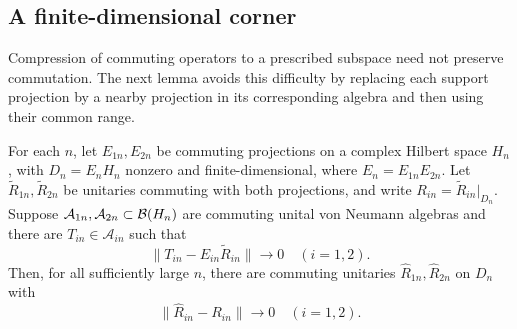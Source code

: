 \subsection{A finite-dimensional corner}
Compression of commuting operators to a prescribed subspace need not
preserve commutation. The next lemma avoids this difficulty by
replacing each support projection by a nearby projection in its
corresponding algebra and then using their common range.

\begin{lemma}\label{lem:corner}
For each $n$, let $E_{1n},E_{2n}$ be commuting projections on a complex
Hilbert space $H_n$, with $D_n=E_nH_n$ nonzero and finite-dimensional,
where $E_n=E_{1n}E_{2n}$. Let $\widetilde R_{1n},\widetilde R_{2n}$
be unitaries commuting with both projections, and write
$R_{in}=\widetilde R_{in}|_{D_n}$.
Suppose $\mathcal A_{1n},\mathcal A_{2n}\subset\mathcal B(H_n)$ are
commuting unital von Neumann algebras and there are
$T_{in}\in\mathcal A_{in}$ such that
\begin{equation}\label{eq:corner-hypothesis}
 \|T_{in}-E_{in}\widetilde R_{in}\|\longrightarrow0
 \quad(i=1,2).
\end{equation}
Then, for all sufficiently large $n$, there are commuting unitaries
$\widehat R_{1n},\widehat R_{2n}$ on $D_n$ with
\[
 \|\widehat R_{in}-R_{in}\|\longrightarrow0\quad(i=1,2).
\]
\end{lemma}

